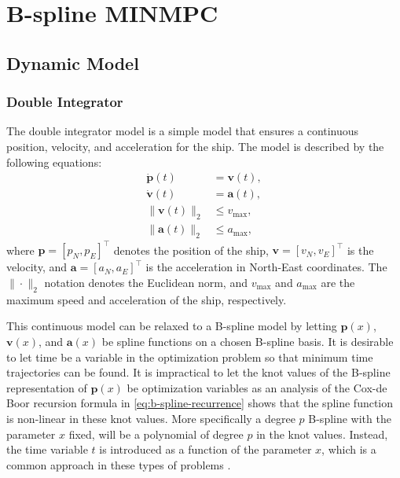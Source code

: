 
\chapter{B-spline MINMPC}\label{chap:b-spline-minmpc}

\section{Dynamic Model}
\subsection{Double Integrator}\label{sec:double-integrator}
The double integrator model is a simple model that ensures a continuous position, velocity, and acceleration for the ship. The model is described by the following equations:
\begin{subequations}\label{eq:double-integrator}
    \begin{align}
        \dot{\mathbf{p}}(t) &= \mathbf{v}(t), \label{eq:double-integrator-x} \\
        \dot{\mathbf{v}}(t) &= \mathbf{a}(t), \label{eq:double-integrator-v} \\
        \|\mathbf{v}(t)\|_2 &\leq v_{\max}, \label{eq:double-integrator-vmax} \\
        \|\mathbf{a}(t)\|_2 &\leq a_{\max}, \label{eq:double-integrator-a}
    \end{align}
\end{subequations}
where $\mathbf{p} = [p_N, p_E]^\top$ denotes the position of the ship, $\mathbf{v} = [v_N, v_E]^\top$ is the velocity, and $\mathbf{a} = [a_N, a_E]^\top$ is the acceleration in North-East coordinates. The $\|\cdot\|_2$ notation denotes the Euclidean norm, and $v_{\max}$ and $a_{\max}$ are the maximum speed and acceleration of the ship, respectively.

This continuous model can be relaxed to a B-spline model by letting $\mathbf{p}(x)$, $\mathbf{v}(x)$, and $\mathbf{a}(x)$ be spline functions on a chosen B-spline basis. It is desirable to let time be a variable in the optimization problem so that minimum time trajectories can be found. It is impractical to let the knot values of the B-spline representation of $\mathbf{p}(x)$ be optimization variables as an analysis of the Cox-de Boor recursion formula in \cref{eq:b-spline-recurrence} shows that the spline function is non-linear in these knot values. More specifically a degree $p$ B-spline with the parameter $x$ fixed, will be a polynomial of degree $p$ in the knot values. Instead, the time variable $t$ is introduced as a function of the parameter $x$, which is a common approach in these types of problems \citep{mercy2017spline,ShortestPathsConvexSets}. 

